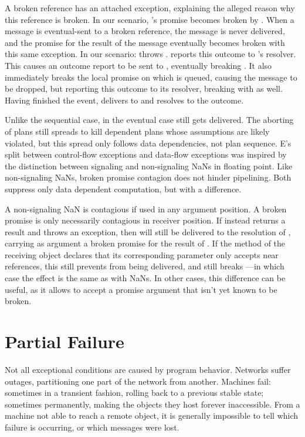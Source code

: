 \documentclass{llncs}
\begin{document}
A broken reference has an attached exception, explaining the alleged
reason why this reference is broken. In our scenario, 's
promise becomes broken by . When a message is eventual-sent to
a broken reference, the message is never delivered, and the promise
for the result of the message eventually becomes broken with this same
exception. In our scenario:  throws .  reports
this outcome to 's resolver. This causes an outcome report to
be sent to , eventually breaking . It also immediately
breaks the local promise on which  is queued, causing the
 message to be dropped, but reporting this outcome to its
resolver, breaking  with  as well. Having finished the
 event,  delivers  to  and resolves
 to the outcome.

Unlike the sequential case, in the eventual case  still gets
delivered. The aborting of plans still spreads to kill dependent plans
whose assumptions are likely violated, but this spread only follows
data dependencies, not plan sequence. E's split between control-flow
exceptions and data-flow exceptions was inspired by the distinction
between signaling and non-signaling NaNs in floating point. Like
non-signaling NaNs, broken promise contagion does not hinder
pipelining. Both suppress only data dependent computation, but with a
difference.

A non-signaling NaN is contagious if used in any argument position. A
broken promise is only necessarily contagious in receiver position. If
instead  returns a result and  throws an
exception, then  will still be delivered to the resolution
of , carrying as argument a broken promise for the result of
. If the  method of the receiving object
declares that its corresponding parameter only accepts near
references, this still prevents  from being delivered, and
still breaks ---in which case the effect is the same as with
NaNs. In other cases, this difference can be useful, as it allows
 to accept a promise argument that isn't yet known to be
broken.

\section{Partial Failure}

Not all exceptional conditions are caused by program behavior.
Networks suffer outages, partitioning one part of the network from
another. Machines fail: sometimes in a transient fashion, rolling back
to a previous stable state; sometimes permanently, making the objects
they host forever inaccessible. From a machine not able to reach a
remote object, it is generally impossible to tell which failure is
occurring, or which messages were lost.
\end{document}
